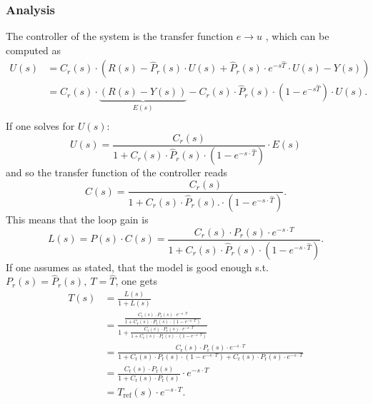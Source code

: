 \documentclass[a4paper,12 pt]{article}
\numberwithin{equation}{section}
\theoremstyle{definition}
\theoremstyle{remark}
\theoremstyle{definition}
\theoremstyle{definition}
\theoremstyle{definition}
\theoremstyle{remark}
\begin{document}
\subsubsection{Analysis}
The controller of the system is the transfer function $e\rightarrow u$ , which can be computed as
\begin{equation}
\begin{split}
U(s)&=C_r(s)\cdot (R(s)-\hat{P}_r(s)\cdot U(s)+\hat{P}_r(s)\cdot e^{-s\hat{T}}\cdot U(s) -Y(s))\\
&=C_r(s)\cdot \underbrace{(R(s)-Y(s))}_{E(s)} - C_r(s)\cdot \hat{P}_r(s)\cdot (1-e^{-s\hat{T}})\cdot U(s).\\
\end{split}
\end{equation}
If one solves for $U(s)$:
\begin{equation}
U(s)=\frac{C_r(s)}{1+C_r(s)\cdot \hat{P}_r(s)\cdot(1-e^{-s\cdot\hat{T}})}\cdot E(s)
\end{equation}
and so the transfer function of the controller reads
\begin{equation}
C(s)=\frac{C_r(s)}{1+C_r(s)\cdot\hat P_r(s).\cdot(1-e^{-s\cdot\hat T})}.
\end{equation}
This means that the loop gain is
\begin{equation}
L(s)=P(s)\cdot C(s)=\frac{C_r(s)\cdot P_r(s)\cdot e^{-s\cdot T}}{1+C_r(s)\cdot\hat P_r(s)\cdot(1-e^{-s\cdot\hat T})}.
\end{equation}
If one assumes as stated, that the model is good enough s.t. $P_r(s)=\hat{P}_r(s),\ T=\hat{T}$, one gets
\begin{equation}
\begin{split}
T(s)&=\frac{L(s)}{1+L(s)} \\
&=\frac{\frac{C_\text{r}(s)\cdot P_\text{r}(s)\cdot e^{-s\cdot T}}{1+C_\text{r}(s)\cdot P_\text{r}(s)\cdot(1-e^{-s\cdot T})}}{1+\frac{C_\text{r}(s)\cdot P_\text{r}(s)\cdot e^{-s\cdot T}}{1+C_\text{r}(s)\cdot P_\text{r}(s)\cdot(1-e^{-s\cdot T})}} \\
&=\frac{C_\text{r}(s)\cdot P_\text{r}(s)\cdot e^{-s\cdot T}}{1+C_\text{r}(s)\cdot P_\text{r}(s)\cdot(1-e^{-s\cdot T})+C_\text{r}(s)\cdot P_\text{r}(s)\cdot e^{-s\cdot T}} \\
&=\frac{C_\text{r}(s)\cdot P_\text{r}(s)}{1+C_\text{r}(s)\cdot P_\text{r}(s)}\cdot e^{-s\cdot T} \\
&=T_\mathrm{ref}(s)\cdot e^{-s\cdot T}.
\end{split}
\end{equation}
\newpage
\end{document}
